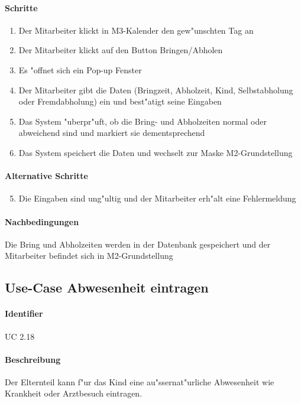 	\paragraph{Schritte}
	\begin{enumerate}
		\item Der Mitarbeiter klickt in M3-Kalender den gew"unschten Tag an
		\item Der Mitarbeiter klickt auf den Button \dq Bringen/Abholen\dq
		\item Es "offnet sich ein Pop-up Fenster
		\item Der Mitarbeiter gibt die Daten (Bringzeit, Abholzeit, Kind, Selbstabholung oder Fremdabholung) ein und best"atigt seine Eingaben
		\item Das System "uberpr"uft, ob die Bring- und Abholzeiten normal oder abweichend sind und markiert sie dementsprechend
		\item Das System speichert die Daten und wechselt zur Maske M2-Grundstellung
	\end{enumerate}
	
	\paragraph{Alternative Schritte}
	\begin{enumerate}
		\setcounter{enumi}{4}
		\item  Die Eingaben sind ung"ultig und der Mitarbeiter erh"alt eine Fehlermeldung
	\end{enumerate}
	
	\paragraph{Nachbedingungen}
	Die Bring und Abholzeiten werden in der Datenbank gespeichert und der Mitarbeiter befindet sich in M2-Grundstellung



  
  \newpage
 \subsection{Use-Case Abwesenheit eintragen}
  \paragraph{Identifier}
  UC 2.18
  \paragraph{Beschreibung}
  Der Elternteil kann f"ur das Kind eine au"ssernat"urliche Abwesenheit wie Krankheit oder Arztbesuch eintragen.
